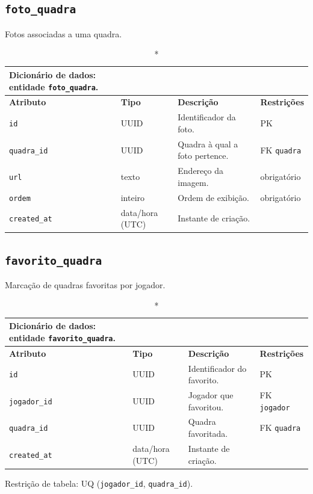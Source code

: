 \begin{apendicesenv}
    \subsection*{\texttt{foto\_quadra}}
    Fotos associadas a uma quadra.
    \begin{longtable}{p{2.5cm}p{2.1cm}p{5.8cm}p{2.9cm}}
    \caption*{Dicionário de dados: entidade \texttt{foto\_quadra}.}\\
        \hline
        \textbf{Atributo} & \textbf{Tipo} & \textbf{Descrição} & \textbf{Restrições} \\
        \hline
        \endhead
        \texttt{id} & UUID & Identificador da foto. & PK \\
        \texttt{quadra\_id} & UUID & Quadra à qual a foto pertence. & FK \texttt{quadra} \\
        \texttt{url} & texto & Endereço da imagem. & obrigatório \\
        \texttt{ordem} & inteiro & Ordem de exibição. & obrigatório \\
        \texttt{created\_at} & data/hora (UTC) & Instante de criação. & \\
        \hline
    \end{longtable}

    \subsection*{\texttt{favorito\_quadra}}
    Marcação de quadras favoritas por jogador.
    \begin{longtable}{p{2.5cm}p{2.1cm}p{5.8cm}p{2.9cm}}
    \caption*{Dicionário de dados: entidade \texttt{favorito\_quadra}.}\\
        \hline
        \textbf{Atributo} & \textbf{Tipo} & \textbf{Descrição} & \textbf{Restrições} \\
        \hline
        \endhead
        \texttt{id} & UUID & Identificador do favorito. & PK \\
        \texttt{jogador\_id} & UUID & Jogador que favoritou. & FK \texttt{jogador} \\
        \texttt{quadra\_id} & UUID & Quadra favoritada. & FK \texttt{quadra} \\
        \texttt{created\_at} & data/hora (UTC) & Instante de criação. & \\
        \hline
    \end{longtable}
    \noindent Restrição de tabela: UQ (\texttt{jogador\_id}, \texttt{quadra\_id}).


\end{apendicesenv}
